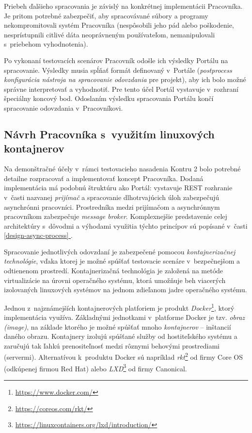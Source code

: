 \documentclass[
  digital, %
  oneside, %
  table,   %
  lof,     %
  lot,   %
]{fithesis3}
\newcommand*{\fullref}[1]{\hyperref[{#1}]{\ref*{#1} \nameref*{#1}}}
\newcommand*{\footurl}[1]{\footnote{\url{#1}}}
\begin{document}
Priebeh ďalšieho spracovania je závislý na konkrétnej implementácii Pracovníka. Je pritom potrebné zabezpečiť, aby spracovávané súbory a programy nekompromitovali systém Pracovníka (nespôsobili jeho pád alebo poškodenie, nesprístupnili citlivé dáta neoprávneným používateľom, nemanipulovali s~priebehom vyhodnotenia). 

Po vykonaní testovacích scenárov Pracovník odošle ich výsledky Portálu na spracovanie. Výsledky musia spĺňať formát definovaný v~Portále (\emph{postprocess konfigurácia nástroja na spracovanie odovzdania} pre projekt), aby ich bolo možné správne interpretovať a vyhodnotiť. Pre tento účel Portál vystavuje v~rozhraní špeciálny koncový bod. Odoslaním výsledku spracovania Portálu končí spracovanie odovzdania v~Pracovníkovi.

\subsection{Návrh Pracovníka s~využitím linuxových kontajnerov}
\label{design-worker-lc}

Na demonštračné účely v~rámci testovacieho nasadenia Kontru 2 bolo potrebné detailne rozpracovať a implementovať koncept Pracovníka. Dodaná implementácia má podobnú štruktúru ako Portál: vystavuje REST rozhranie v~časti nazvanej \emph{prijímač} a spracovanie dlhotrvajúcich úloh zabezpečujú asynchrónni pracovníci. Prostredníka medzi prijímačom a asynchrónnym pracovníkom zabezpečuje \emph{message broker}. Komplexnejšie predstavenie celej architektúry s~dôvodmi a výhodami využitia týchto princípov sú popísané v~časti \fullref{design-async-process}. 

Spracovanie jednotlivých odovzdaní je zabezpečené pomocou \emph{kontajnerizačnej technológie}, vďaka ktorej je možné spúšťať testovacie scenáre v~bezpečnejšom a odtienenom prostredí. Kontajnerizačná technológia je založená na metóde virtualizácie na úrovni operačného systému, ktorá umožňuje beh viacerých izolovaných linuxových systémov na jednom zdieľanom jadre operačného systému\cite{linux-containers-rh}. 

Jednou z~najznámejších kontajnerových platforiem je produkt \emph{Docker}\footnote{\url{https://www.docker.com/}}, ktorý implementácia využíva. Základnými jednotkami v~platforme Docker je tzv. \emph{obraz (image)}, na základe ktorého je možné spúšťať mnoho \emph{kontajnerov} -- inštancií daného obrazu. Kontajnery izolujú spúšťané služby od hostiteľského systému a zaručujú tak ľahkú prenositeľnosť medzi rôznymi behovými prostrediami (servermi)\cite{docker-stuff}. Alternatívou k~produktu Docker sú napríklad \emph{rkt}\footurl{https://coreos.com/rkt/} od firmy Core OS (odkúpenej firmou Red Hat) alebo \emph{LXD}\footurl{https://linuxcontainers.org/lxd/introduction/} od firmy Canonical. 
\end{document}
